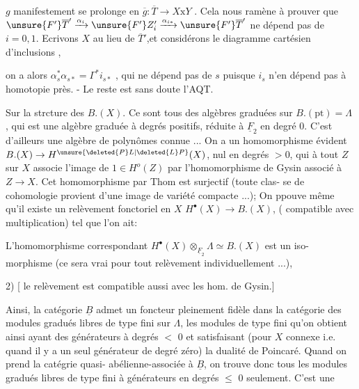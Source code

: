 
$g$ manifestement se prolonge en $\overline{g} : \overline{T} \to X\mathrm{x}Y$ . Cela nous ramène à prouver
que  $\unsure{F'}\overline{T}' \xrightarrow{\alpha_i} \unsure{F'}Z'_i \xrightarrow{\alpha_{i*}} \unsure{F'}\overline{T}'$ ne dépend pas de $i=0,1$. Ecrivons $X$ au lieu de $\overline{T}'$,et
considérons le diagramme cartésien d'inclusions
,

on a alors $\alpha_s^*\alpha_{s*}=\Gamma^*i_{s*}$ , qui ne dépend pas de $s$ puisque $i_s$ n'en
dépend pas à homotopie près. - Le reste est sans doute l'AQT.

Sur la strcture des $B.(X)$. Ce sont tous des algèbres graduées
sur $B.(\mathrm{pt})=\Lambda$ , qui est une algèbre graduée à degrés positifs, réduite
\margin{\unsure{\S}}
à $\underline{F}_2$ en degré 0. C'est d'ailleurs une algèbre de polynômes  connue ...
On a un homomorphisme évident $B.(X)\to H^{\unsure{\deleted{P}L|\deleted{L}P}}(X)$, nul en degrés $>$0, qui
à tout $Z$ sur $X$ associe l'image de $1\in H^o(Z)$ par l'homomorphisme de Gysin
associé à $Z\to X$. Cet homomorphisme par Thom est surjectif (toute clas-%
se de cohomologie provient d'une image de variété compacte ...); 
On ppouve même qu'il existe un relèvement fonctoriel en $X$
$H^\bullet(X)\to B.(X)$, ( compatible avec multiplication) tel que l'on ait:

 L'homomorphisme correspondant $H^\bullet(X)\otimes_{\underline{F}_2}\Lambda\simeq B.(X)$ est un iso-%
morphisme (ce sera vrai pour tout relèvement individuellement ...), 

2) [ le relèvement est compatible aussi avec les hom. de Gysin.]

Ainsi, la catégorie $\underline{B}$ admet un foncteur pleinement fidèle dans la
catégorie des modules gradués libres de type fini sur $\Lambda$, les modules
de type fini qu'on obtient ainsi ayant des générateurs à degrés $<$ 0 et
satisfaisant (pour $X$ connexe i.e. quand il y a un seul générateur de
degré zéro) la dualité de Poincaré. Quand on prend la catégrie quasi-%
abélienne-associée à $\underline{B}$, on trouve donc tous les modules gradués libres
de type fini à générateurs  en degrés $\leq$ 0 seulement. C'est une


